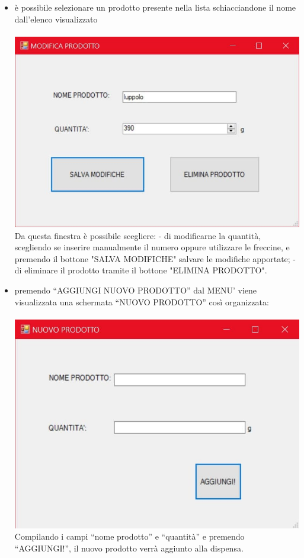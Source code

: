 \documentclass[a4paper, titlepage]{article}
\begin{document}
\begin{itemize}
    \item è possibile selezionare un prodotto presente nella lista schiacciandone il nome dall'elenco visualizzato\\\\
    \includegraphics[scale=0.30]{Immagini/form/Form ModificaProd.jpg}
    \\Da questa finestra è possibile scegliere:
        \subitem - di modificarne la quantità, scegliendo se inserire manualmente il numero oppure utilizzare le freccine, e premendo il bottone "SALVA MODIFICHE" salvare le modifiche apportate;
        \subitem - di eliminare il prodotto tramite il bottone "ELIMINA PRODOTTO".
    \item premendo “AGGIUNGI NUOVO PRODOTTO” dal MENU’ viene visualizzata una schermata “NUOVO PRODOTTO” così organizzata:\\\\
    \includegraphics[scale=0.30]{Immagini/form/Form AggiuntaProd.jpg}
    \\Compilando i campi “nome prodotto” e “quantità” e premendo “AGGIUNGI!”, il nuovo prodotto verrà aggiunto alla dispensa.
\end{itemize}
\newpage
\end{document}
